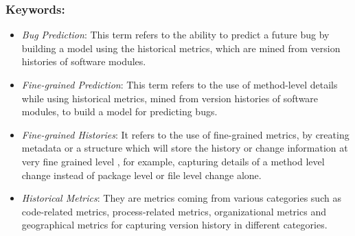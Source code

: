 \documentclass{sig-alternate-05-2015}
\begin{document}
\subsubsection{Keywords:}
\begin{itemize}
\item \emph{Bug Prediction}:  This term refers to the ability to predict a future bug by building a model using the historical metrics, which are mined from version histories of software modules.
\item \emph{Fine-grained Prediction}: This term refers to the use of method-level details while using historical metrics, mined from version histories of software modules, to build a model for predicting bugs.
\item \emph{Fine-grained Histories}: It refers to the use of fine-grained metrics, by creating metadata or a structure which will store the history or change information at very fine grained level , for example, capturing details of a method level change instead of package level or file level change alone.
\item \emph{Historical Metrics}: They are metrics coming from various categories such as code-related metrics, process-related metrics, organizational metrics and geographical metrics for capturing version history in different categories.
\end{itemize} 
\end{document}
